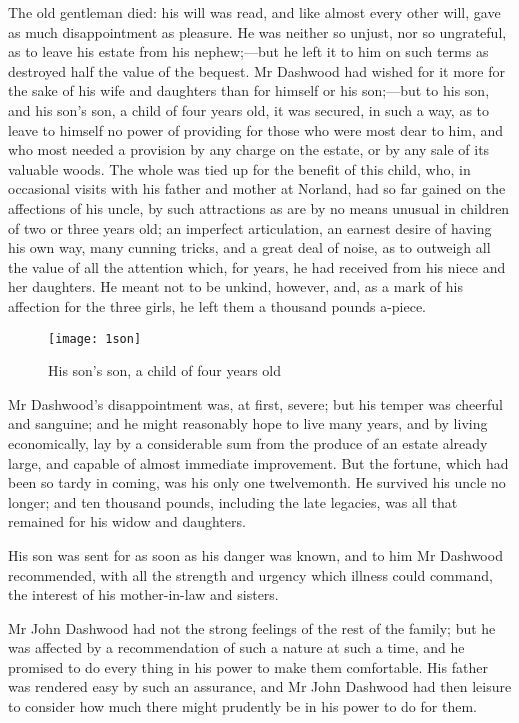 The old gentleman died: his will was read, and like almost every other will, gave as much disappointment as pleasure. He was neither so unjust, nor so ungrateful, as to leave his estate from his nephew;—but he left it to him on such terms as destroyed half the value of the bequest. Mr Dashwood had wished for it more for the sake of his wife and daughters than for himself or his son;—but to his son, and his son’s son, a child of four years old, it was secured, in such a way, as to leave to himself no power of providing for those who were most dear to him, and who most needed a provision by any charge on the estate, or by any sale of its valuable woods. The whole was tied up for the benefit of this child, who, in occasional visits with his father and mother at Norland, had so far gained on the affections of his uncle, by such attractions as are by no means unusual in children of two or three years old; an imperfect articulation, an earnest desire of having his own way, many cunning tricks, and a great deal of noise, as to outweigh all the value of all the attention which, for years, he had received from his niece and her daughters. He meant not to be unkind, however, and, as a mark of his affection for the three girls, he left them a thousand pounds a-piece.

\begin{figure}[tbph]
\centering
\texttt{[image: 1son]}
\caption{His son’s son, a child of four years old}
\end{figure}

Mr Dashwood’s disappointment was, at first, severe; but his temper was cheerful and sanguine; and he might reasonably hope to live many years, and by living economically, lay by a considerable sum from the produce of an estate already large, and capable of almost immediate improvement. But the fortune, which had been so tardy in coming, was his only one twelvemonth. He survived his uncle no longer; and ten thousand pounds, including the late legacies, was all that remained for his widow and daughters.

His son was sent for as soon as his danger was known, and to him Mr Dashwood recommended, with all the strength and urgency which illness could command, the interest of his mother-in-law and sisters.

Mr John Dashwood had not the strong feelings of the rest of the family; but he was affected by a recommendation of such a nature at such a time, and he promised to do every thing in his power to make them comfortable. His father was rendered easy by such an assurance, and Mr John Dashwood had then leisure to consider how much there might prudently be in his power to do for them.


